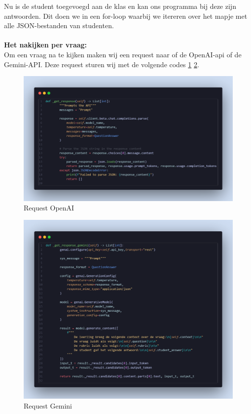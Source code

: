 \documentclass[12pt]{article}
\begin{document}
Nu is de student toegevoegd aan de klas en kan ons programma bij deze zijn antwoorden. Dit doen we in een for-loop waarbij we itereren over het mapje met alle JSON-bestanden van studenten.
\\ \\
\textbf{Het nakijken per vraag:} \\
Om een vraag na te kijken maken wij een request naar of de OpenAI-api of de Gemini-API. Deze request sturen wij met de volgende codes \ref{fig:OpenAI_request} \ref{fig:gemini_reques}.

\begin{figure}[H] %
    \centering
    \includegraphics[width=0.9 \textwidth]{./images/methoden/nakijken/get_response.png}
    \caption{Request OpenAI}
    \label{fig:OpenAI_request}
\end{figure}
\begin{figure}[H] %
    \centering
    \includegraphics[width=0.9 \textwidth]{./images/methoden/nakijken/response_gemini.png}
    \caption{Request Gemini}
    \label{fig:gemini_reques}
\end{figure}
\end{document}
